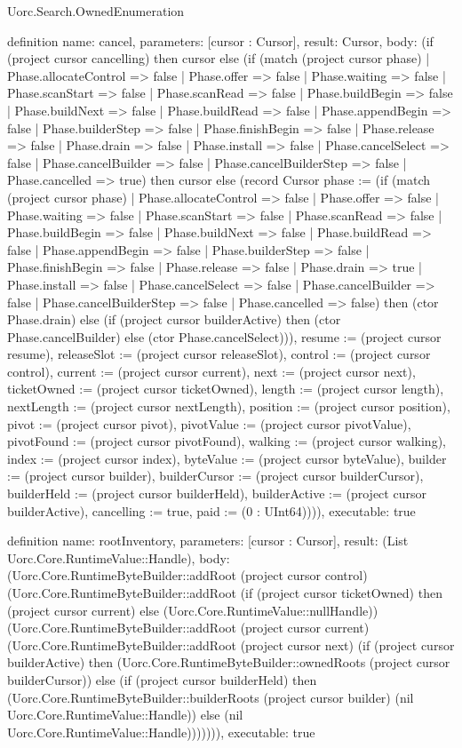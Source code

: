 \begin{lexlean}{Uorc.Search.OwnedEnumeration}
\begin{semanticmodule}
definition{
  name: cancel,
  parameters: [cursor : Cursor],
  result: Cursor,
  body: (if (project cursor cancelling) then cursor else (if (match (project cursor phase)
    | Phase.allocateControl => false
    | Phase.offer => false
    | Phase.waiting => false
    | Phase.scanStart => false
    | Phase.scanRead => false
    | Phase.buildBegin => false
    | Phase.buildNext => false
    | Phase.buildRead => false
    | Phase.appendBegin => false
    | Phase.builderStep => false
    | Phase.finishBegin => false
    | Phase.release => false
    | Phase.drain => false
    | Phase.install => false
    | Phase.cancelSelect => false
    | Phase.cancelBuilder => false
    | Phase.cancelBuilderStep => false
    | Phase.cancelled => true) then cursor else (record Cursor {phase := (if (match (project cursor phase)
    | Phase.allocateControl => false
    | Phase.offer => false
    | Phase.waiting => false
    | Phase.scanStart => false
    | Phase.scanRead => false
    | Phase.buildBegin => false
    | Phase.buildNext => false
    | Phase.buildRead => false
    | Phase.appendBegin => false
    | Phase.builderStep => false
    | Phase.finishBegin => false
    | Phase.release => false
    | Phase.drain => true
    | Phase.install => false
    | Phase.cancelSelect => false
    | Phase.cancelBuilder => false
    | Phase.cancelBuilderStep => false
    | Phase.cancelled => false) then (ctor Phase.drain) else (if (project cursor builderActive) then (ctor Phase.cancelBuilder) else (ctor Phase.cancelSelect))), resume := (project cursor resume), releaseSlot := (project cursor releaseSlot), control := (project cursor control), current := (project cursor current), next := (project cursor next), ticketOwned := (project cursor ticketOwned), length := (project cursor length), nextLength := (project cursor nextLength), position := (project cursor position), pivot := (project cursor pivot), pivotValue := (project cursor pivotValue), pivotFound := (project cursor pivotFound), walking := (project cursor walking), index := (project cursor index), byteValue := (project cursor byteValue), builder := (project cursor builder), builderCursor := (project cursor builderCursor), builderHeld := (project cursor builderHeld), builderActive := (project cursor builderActive), cancelling := true, paid := (0 : UInt64)}))),
  executable: true
}

definition{
  name: rootInventory,
  parameters: [cursor : Cursor],
  result: (List Uorc.Core.RuntimeValue::Handle),
  body: (Uorc.Core.RuntimeByteBuilder::addRoot (project cursor control) (Uorc.Core.RuntimeByteBuilder::addRoot (if (project cursor ticketOwned) then (project cursor current) else (Uorc.Core.RuntimeValue::nullHandle)) (Uorc.Core.RuntimeByteBuilder::addRoot (project cursor current) (Uorc.Core.RuntimeByteBuilder::addRoot (project cursor next) (if (project cursor builderActive) then (Uorc.Core.RuntimeByteBuilder::ownedRoots (project cursor builderCursor)) else (if (project cursor builderHeld) then (Uorc.Core.RuntimeByteBuilder::builderRoots (project cursor builder) (nil Uorc.Core.RuntimeValue::Handle)) else (nil Uorc.Core.RuntimeValue::Handle))))))),
  executable: true
}


\end{semanticmodule}
\end{lexlean}
